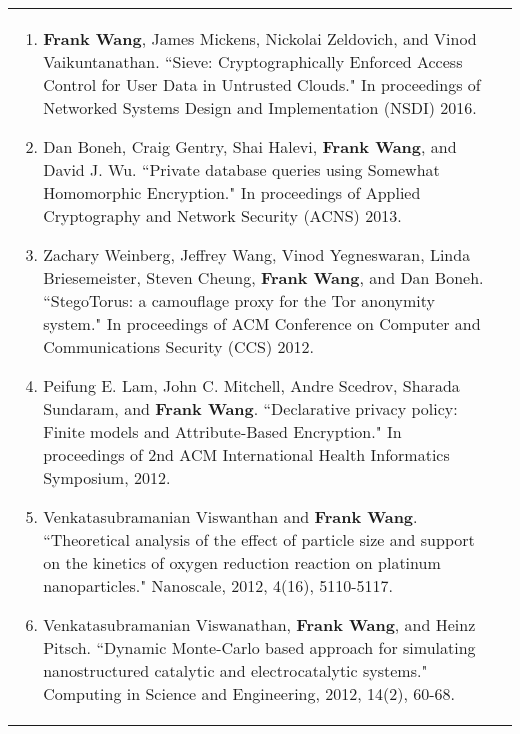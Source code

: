 \documentclass[a4paper,10pt]{article}
\begin{document}
\begin{longtable}{ p{0.9in} l }
\begin{minipage}[t]{0.78 \textwidth}
\begin{enumerate}[leftmargin=*]
\item{\textbf{Frank Wang}, James Mickens, Nickolai Zeldovich, and  Vinod Vaikuntanathan. ``Sieve: Cryptographically Enforced Access Control for User Data in Untrusted Clouds." In proceedings of Networked Systems Design and Implementation (NSDI) 2016.}
               
\item{Dan Boneh, Craig Gentry, Shai Halevi, \textbf{Frank Wang}, and David J. Wu. ``Private database queries using Somewhat Homomorphic Encryption." In proceedings of Applied Cryptography and Network Security (ACNS) 2013.}

\item{Zachary Weinberg, Jeffrey Wang, Vinod Yegneswaran, Linda Briesemeister, Steven Cheung, \textbf{Frank Wang}, and Dan Boneh. ``StegoTorus: a camouflage proxy for the Tor anonymity system." In proceedings of ACM Conference on Computer and Communications Security (CCS) 2012.}

\item{Peifung E. Lam, John C. Mitchell, Andre Scedrov, Sharada Sundaram, and \textbf{Frank Wang}. ``Declarative privacy policy: Finite models and Attribute-Based Encryption." In proceedings of 2nd ACM International Health Informatics Symposium, 2012.}

\item{Venkatasubramanian Viswanthan and \textbf{Frank Wang}. ``Theoretical analysis of the effect of particle size and support on the kinetics of oxygen reduction reaction on platinum nanoparticles." Nanoscale, 2012, 4(16), 5110-5117.}

\item{Venkatasubramanian Viswanathan, \textbf{Frank Wang}, and Heinz Pitsch. ``Dynamic Monte-Carlo based approach for simulating nanostructured catalytic and electrocatalytic systems." Computing in Science and Engineering, 2012, 14(2), 60-68.}

\end{enumerate}
\end{minipage} \tabularnewline

\end{longtable} 
\end{document}
